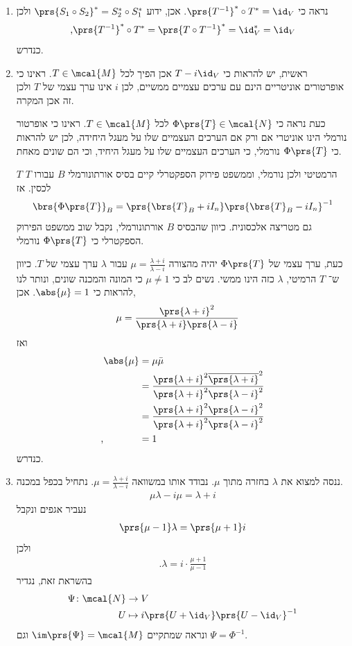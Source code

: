 \documentclass[a4paper,10pt,twoside,openany]{book}
\begin{document}
\begin{solution}
\begin{enumerate}
\item נראה כי
$\prs{T^{-1}}^* \circ T^* = \id_V$.
אכן, ידוע
$\prs{S_1 \circ S_2}^* = S_2^* \circ S_1^*$
ולכן
\[\text{,} \prs{T^{-1}}^* \circ T^* = \prs{T \circ T^{-1}}^* = \id_V^* = \id_V\]
כנדרש.

\item
ראשית, יש להראות כי
$T - i \id_V$
אכן הפיך לכל
$T \in \mcal{M}$.
ראינו כי אופרטורים אוניטריים הינם עם ערכים עצמיים ממשיים, לכן
$i$
אינו ערך עצמי של
$T$
ולכן זה אכן המקרה.

כעת נראה כי
$\Phi\prs{T} \in \mcal{N}$
לכל
$T \in \mcal{M}$.
ראינו כי אופרטור נורמלי הינו אוניטרי אם ורק אם הערכים העצמיים שלו על מעגל היחידה, לכן יש להראות כי
$\Phi\prs{T}$
נורמלי, כי הערכים העצמיים שלו על מעגל היחיד, וכי הם שונים מאחת.

$T$
הרמטיטי ולכן נורמלי, וממשפט פירוק הספקטרלי קיים בסיס אורתונורמלי
$B$
עבורו
$T$
לכסין.
אז
\[\brs{\Phi\prs{T}}_B = \prs{\brs{T}_B + i I_n} \prs{\brs{T}_B - i I_n}^{-1}\]
גם מטריצה אלכסונית. כיוון שהבסיס
$B$
אורתונורמלי, נקבל שוב ממשפט הפירוק הספקטרלי כי
$\Phi\prs{T}$
נורמלי.

כעת, ערך עצמי של
$\Phi\prs{T}$
יהיה מהצורה
$\mu = \frac{\lambda + i}{\lambda - i}$
עבור
$\lambda$
ערך עצמי של
$T$.
כיוון ש־%
$T$
הרמיטי,
$\lambda$
כזה הינו ממשי.
נשים לב כי
$\mu \neq 1$
כי המונה והמכנה שונים, ונותר לנו להראות כי
$\abs{\mu} = 1$.
אכן,
\begin{align*}
\mu &= \frac{\prs{\lambda + i}^2}{\prs{\lambda + i}\prs{\lambda - i}}
\end{align*}
ואז
\begin{align*}
\abs{\mu} &= \mu \bar{\mu}
\\&= \frac{\prs{\lambda + i}^2 \overline{\prs{\lambda + i}}^2}{\prs{\lambda + i}^2\prs{\lambda - i}^2}
\\&= \frac{\prs{\lambda + i}^2\prs{\lambda - i}^2}{\prs{\lambda + i}^2\prs{\lambda - i}^2}
\\ \text{,} \hphantom{\abs{\mu}} &= 1
\end{align*}
כנדרש.

\item
ננסה למצוא את
$\lambda$
בחזרה מתוך
$\mu$.
נבודד אותו במשוואה
$\mu = \frac{\lambda + i}{\lambda - i}$.
נתחיל בכפל במכנה.
\begin{align*}
\mu \lambda - i \mu = \lambda + i
\end{align*}
נעביר אגפים ונקבל
\begin{align*}
\prs{\mu - 1}\lambda = \prs{\mu + 1}i
\end{align*}
ולכן
\begin{align*}
\text{.} \lambda = i \cdot \frac{\mu + 1}{\mu - 1}
\end{align*}
בהשראת זאת, נגדיר
\begin{align*}
\Psi \colon \mcal{N} &\to V \\
U &\mapsto i \prs{U + \id_V}\prs{U - \id_V}^{-1}
\end{align*}
ונראה שמתקיים
$\im\prs{\Psi} = \mcal{M}$
וגם
$\Psi = \Phi^{-1}$.


\end{enumerate}
\end{solution}
\end{document}

